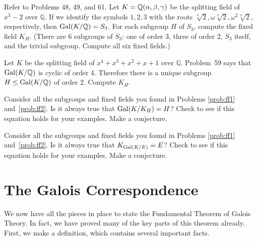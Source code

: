 \begin{problem}\label{prob:ff1}
Refer to Problems 48, 49, and 61. Let $K=\mathbb{Q}(\alpha,\beta,\gamma)$ be the splitting field of $x^3-2$ over $\mathbb{Q}$.  If we identify the symbols $1,2,3$ with the roots $\sqrt[3]{2}, \omega\sqrt[3]{2}, \omega^2\sqrt[3]{2}$, respectively, then $\operatorname{Gal}(K/\mathbb{Q}) = S_3$.  For each subgroup $H$ of $S_3$, compute the fixed field $K_H$.  (There are 6 subgroups of $S_3$: one of order 3, three of order 2, $S_3$ itself, and the trivial subgroup.  Compute all six fixed fields.)
\end{problem}



\begin{problem}\label{prob:ff2}
Let $K$ be the splitting field of $x^4+x^3+x^2+x+1$ over $\mathbb{Q}$.  Problem~59 says that $\operatorname{Gal}(K/\mathbb{Q})$ is cyclic of order 4.  Therefore there is a unique subgroup $H \leq \operatorname{Gal}(K/\mathbb{Q})$ of order 2.  Compute $K_H$.
\end{problem}



\begin{problem}
    Consider all the subgroups and fixed fields you found in Problems \ref{prob:ff1} and~\ref{prob:ff2}.  Is it always true that $\operatorname{Gal}(K/K_H) = H$?  Check to see if this equation holds for your examples. Make a conjecture.
\end{problem}



\begin{problem}
 Consider all the subgroups and fixed fields you found in Problems \ref{prob:ff1} and~\ref{prob:ff2}.  Is it always true that $K_{\operatorname{Gal}(K/E)} = E$?  Check to see if this equation holds for your examples.  Make a conjecture.
\end{problem}

\section{The Galois Correspondence}

We now have all the pieces in place to state the Fundamental Theorem of Galois Theory. In fact, we have proved many of the key parts of this theorem already. First, we make a definition, which contains several important facts.

